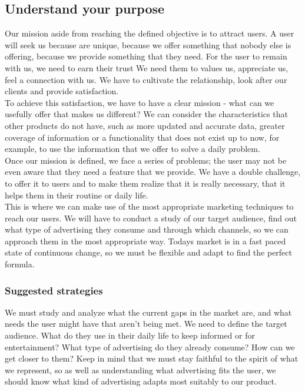 \subsection{Understand your purpose}

Our mission aside from reaching the defined objective is to attract users.
A user will seek us because are unique, because we offer something that
nobody else is offering, because we provide something that they need.
For the user to remain with us, we need to earn their trust We need them to values us, appreciate us, feel a connection with us.
We have to cultivate the relationship, look after our clients and provide satisfaction.\\

To achieve this satisfaction, we have to have a clear mission - what can we usefully offer that makes us different?
We can consider the characteristics that other products do not have, such as more updated and accurate data,
greater coverage of information or a functionality that does not exist up to now, for example, to use the
information that we offer to solve a daily problem.\\

Once our mission is defined, we face a series of problems; the user may not be even aware that they need a feature that we provide.
We have a double challenge, to offer it to users and
to make them realize that it is really necessary, that it helps them in their routine or daily life.\\

This is where we can make use of the most appropriate marketing techniques to reach our users.
We will have to conduct a study of our target audience, find out what type of advertising they consume and through which channels,
so we can approach them in the most appropriate way. Todays market is in a fast paced state of continuous change,
so we must be flexible and adapt to find the perfect formula.

\subsubsection*{Suggested strategies}

We must study and analyze what the current gaps in the market are, and what needs the user might have that aren't being met.
We need to define the target audience. What do they use in their daily life to keep informed or for entertainment?
What type of advertising do they already consume? How can we get closer to them? Keep in mind that we must stay
faithful to the spirit of what we represent, so as well as understanding what advertising fits the user,
we should know what kind of advertising adapts most suitably to our product.

